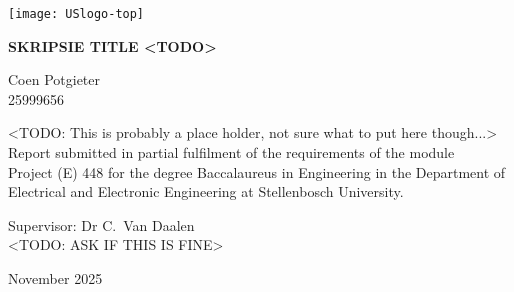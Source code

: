 \graphicspath{{frontmatter/fig/}}

\begin{titlepage}
	\begin{center}
		
		\texttt{[image: USlogo-top]}
		
		\vfill
		
		{\sffamily \bfseries \huge SKRIPSIE TITLE <TODO> \par}
		
		\vfill
		
		{\large {\Large Coen Potgieter} \\ 25999656 \par}
		
		\vfill
		
		\vfill
		
		{<TODO: This is probably a place holder, not sure what to put here though...> \\
        Report submitted in partial fulfilment of the requirements of the module \\
			Project (E) 448 for the degree Baccalaureus in Engineering in the Department of
			Electrical and Electronic Engineering at Stellenbosch University. \par}
		
		\vfill
		
		{\large {Supervisor}: Dr C.\ Van Daalen  } \\
		<TODO: ASK IF THIS IS FINE>
		
		\vfill
		
		{\Large November 2025}
	\end{center}
\end{titlepage}
